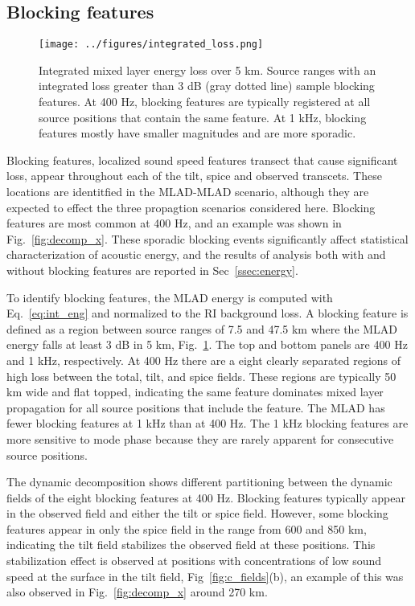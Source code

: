 \documentclass[preprint,NumberedRefs]{JASA}
\begin{document}
\subsection{Blocking features}\label{ssec:blocking}
\begin{figure}
\texttt{[image: ../figures/integrated\_loss.png]}
    \caption{Integrated mixed layer energy loss over 5 km. Source ranges with an integrated loss greater than 3 dB (gray dotted line) sample blocking features. At 400 Hz, blocking features are typically registered at all source positions that contain the same feature. At 1 kHz, blocking features mostly have smaller magnitudes and are more sporadic.}
    \label{fig:blocking}
\end{figure}

Blocking features, localized sound speed features transect that cause significant loss, appear throughout each of the tilt, spice and observed transcets. These locations are identitfied in the MLAD-MLAD scenario, although they are expected to effect the three propagtion scenarios considered here. Blocking features are most common at 400 Hz, and an example was shown in Fig.~\ref{fig:decomp_x}. These sporadic blocking events significantly affect statistical characterization of acoustic energy, and the results of analysis both with and without blocking features are reported in Sec~\ref{ssec:energy}.

To identify blocking features, the MLAD energy is computed with Eq.~\eqref{eq:int_eng} and normalized to the RI background loss. A blocking feature is defined as a region between source ranges of 7.5 and 47.5 km where the MLAD energy falls at least 3 dB in 5 km, Fig.~\ref{fig:blocking}. The top and bottom panels are 400 Hz and 1 kHz, respectively. At 400 Hz there are a eight clearly separated regions of high loss between the total, tilt, and spice fields. These regions are typically 50 km wide and flat topped, indicating the same feature dominates mixed layer propagation for all source positions that include the feature. The MLAD has fewer blocking features at 1 kHz than at 400 Hz. The 1 kHz blocking features are more sensitive to mode phase because they are rarely apparent for consecutive source positions.

The dynamic decomposition shows different partitioning between the dynamic fields of the eight blocking features at 400 Hz. Blocking features typically appear in the observed field and either the tilt or spice field. However, some blocking features appear in only the spice field in the range from 600 and 850 km, indicating the tilt field stabilizes the observed field at these positions. This stabilization effect is observed at positions with concentrations of low sound speed at the surface in the tilt field, Fig~\ref{fig:c_fields}(b), an example of this was also observed in Fig.~\ref{fig:decomp_x} around 270 km.
\end{document}
